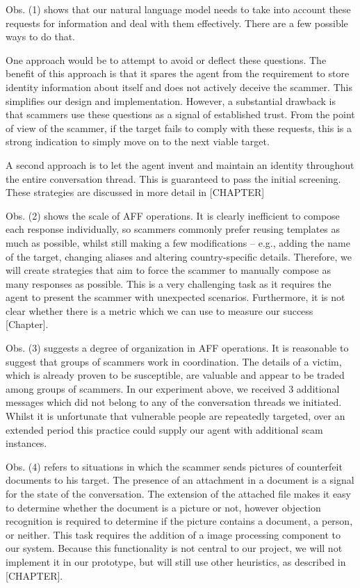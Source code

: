 Obs. (1) shows that our natural language model needs to take into account these requests for information and deal with them effectively. There are a few possible ways to do that. 

One approach would be to attempt to avoid or deflect these questions. The benefit of this approach is that it spares the agent from the requirement to store identity information about itself and does not actively deceive the scammer. This simplifies our design and implementation. However, a substantial drawback is that scammers use these questions as a signal of established trust. From the point of view of the scammer, if the target fails to comply with these requests, this is a strong indication to simply move on to the next viable target. 

A second approach is to let the agent invent and maintain an identity throughout the entire conversation thread. This is guaranteed to pass the initial screening. These strategies are discussed in more detail in [CHAPTER]

Obs. (2) shows the scale of AFF operations. It is clearly inefficient to compose each response individually, so scammers commonly prefer reusing templates as much as possible, whilst still making a few modifications -- e.g., adding the name of the target, changing aliases and altering country-specific details. Therefore, we will create strategies that aim to force the scammer to manually compose as many responses as possible. This is a very challenging task as it requires the agent to present the scammer with unexpected scenarios. Furthermore, it is not clear whether there is a metric which we can use to measure our success [Chapter].

Obs. (3) suggests a degree of organization in AFF operations. It is reasonable to suggest that groups of scammers work in coordination. The details of a victim, which is already proven to be susceptible, are valuable and appear to be traded among groups of scammers. In our experiment above, we received 3 additional messages which did not belong to any of the conversation threads we initiated. Whilst it is unfortunate that vulnerable people are repeatedly targeted, over an extended period this practice could supply our agent with additional scam instances. 

Obs. (4) refers to situations in which the scammer sends pictures of counterfeit documents to his target. The presence of an attachment in a document is a signal for the state of the conversation. The extension of the attached file makes it easy to determine whether the document is a picture or not, however objection recognition is required to determine if the picture contains a document, a person,  or neither. This task requires the addition of a image processing component to our system. Because this functionality is not central to our project, we will not implement it in our prototype, but will still use other heuristics, as described in [CHAPTER].

